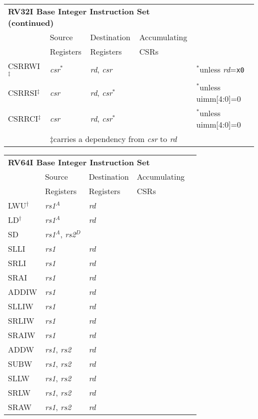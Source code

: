 \begin{tabular}{p{3cm}|p{3cm}|p{2cm}|p{4cm}|p{4cm}}
  \multicolumn{4}{l}{\bf RV32I Base Integer Instruction Set (continued)} \\
  \cline{2-4}
   & Source    & Destination & Accumulating \\
   & Registers & Registers   & CSRs \\
   \cline{2-4}
   CSRRWI$^\ddagger$ & {\em csr}$^*$ & {\em rd}, {\em csr} & & $^*$unless {\em rd}={\tt x0} \\
   \cline{2-4}
   CSRRSI$^\ddagger$ & {\em csr} & {\em rd}, {\em csr}$^*$ & & $^*$unless uimm[4:0]=0  \\
   \cline{2-4}
   CSRRCI$^\ddagger$ & {\em csr} & {\em rd}, {\em csr}$^*$ & & $^*$unless uimm[4:0]=0  \\
   \cline{2-4}
   \multicolumn{1}{c}{} & \multicolumn{3}{l}{$\ddagger$carries a dependency from {\em csr} to {\em rd}}
\end{tabular}

\begin{tabular}{p{3cm}|p{3cm}|p{2cm}|p{4cm}|p{4cm}}
  \multicolumn{4}{l}{\bf RV64I Base Integer Instruction Set} \\
  \cline{2-4}
   & Source    & Destination & Accumulating \\
   & Registers & Registers   & CSRs \\
  \cline{2-4}
   LWU$^\dagger$ & {\em rs1}$^A$ & {\em rd} &   & \\
   \cline{2-4}
   LD$^\dagger$ & {\em rs1}$^A$ & {\em rd} &   & \\
   \cline{2-4}
   SD & {\em rs1}$^A$, {\em rs2}$^D$ &  &   & \\
   \cline{2-4}
   SLLI & {\em rs1} & {\em rd} &   & \\
   \cline{2-4}
   SRLI & {\em rs1} & {\em rd} &   & \\
   \cline{2-4}
   SRAI & {\em rs1} & {\em rd} &   & \\
   \cline{2-4}
   ADDIW & {\em rs1} & {\em rd} &   & \\
   \cline{2-4}
   SLLIW & {\em rs1} & {\em rd} &   & \\
   \cline{2-4}
   SRLIW & {\em rs1} & {\em rd} &   & \\
   \cline{2-4}
   SRAIW & {\em rs1} & {\em rd} &   & \\
   \cline{2-4}
   ADDW & {\em rs1}, {\em rs2} & {\em rd} &   & \\
   \cline{2-4}
   SUBW & {\em rs1}, {\em rs2} & {\em rd} &   & \\
   \cline{2-4}
   SLLW & {\em rs1}, {\em rs2} & {\em rd} &   & \\
   \cline{2-4}
   SRLW & {\em rs1}, {\em rs2} & {\em rd} &   & \\
   \cline{2-4}
   SRAW & {\em rs1}, {\em rs2} & {\em rd} &   & \\
   \cline{2-4}
\end{tabular}

